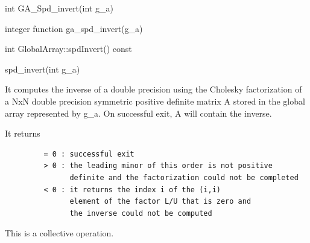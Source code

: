 \documentclass[12pt]{article}
\begin{document}

\begin{capi}
\begin{ccode}
int GA_Spd_invert(int g_a)
\end{ccode}
\begin{funcargs}
\end{funcargs}
\end{capi}

\begin{fapi}
\begin{fcode}
integer function ga_spd_invert(g_a)
\end{fcode}
\begin{funcargs}
\end{funcargs}
\end{fapi}

\begin{cxxapi}
\begin{cxxcode}
int GlobalArray::spdInvert() const
\end{cxxcode}
\begin{funcargs}
\end{funcargs}
\end{cxxapi}

\begin{pyapi}
\begin{pycode}
spd_invert(int g_a)
\end{pycode}
\end{pyapi}


\gcoll

\begin{desc}


It computes the inverse of a double precision using the Cholesky
factorization of a NxN double precision symmetric positive definite
matrix A stored in the global array represented by g_a. On successful
exit, A will contain the inverse.

It returns
\begin{verbatim}
         = 0 : successful exit
         > 0 : the leading minor of this order is not positive
               definite and the factorization could not be completed
         < 0 : it returns the index i of the (i,i)
               element of the factor L/U that is zero and
               the inverse could not be computed
\end{verbatim}

This is a collective operation.
\end{desc}
\end{document}
